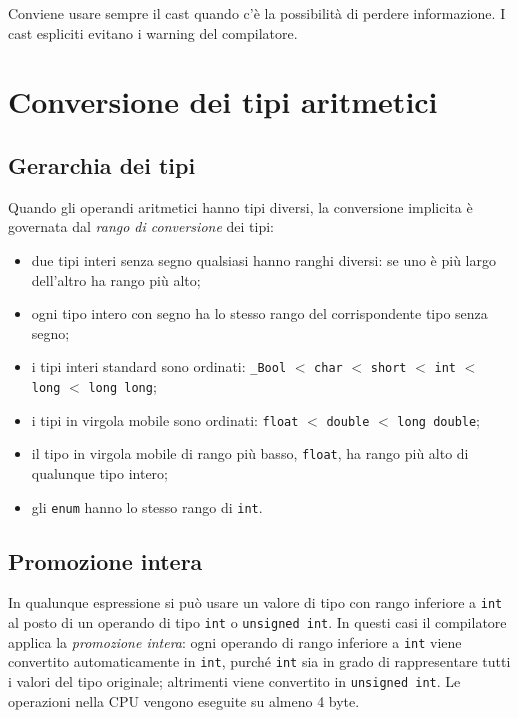 \documentclass[11pt,a4paper]{article}
\begin{document}
\begin{osservazione}
Conviene usare sempre il cast quando c'è la possibilità di perdere informazione. I cast espliciti evitano i warning del compilatore.
\end{osservazione}

\section{Conversione dei tipi aritmetici}

\subsection{Gerarchia dei tipi}

Quando gli operandi aritmetici hanno tipi diversi, la conversione implicita è governata dal \emph{rango di conversione} dei tipi:
\begin{itemize}
    \item due tipi interi senza segno qualsiasi hanno ranghi diversi: se uno è più largo dell'altro ha rango più alto;
    \item ogni tipo intero con segno ha lo stesso rango del corrispondente tipo senza segno;
    \item i tipi interi standard sono ordinati: \lstinline|_Bool| $<$ \lstinline|char| $<$ \lstinline|short| $<$ \lstinline|int| $<$ \lstinline|long| $<$ \lstinline|long long|;
    \item i tipi in virgola mobile sono ordinati: \lstinline|float| $<$ \lstinline|double| $<$ \lstinline|long double|;
    \item il tipo in virgola mobile di rango più basso, \lstinline|float|, ha rango più alto di qualunque tipo intero;
    \item gli \lstinline|enum| hanno lo stesso rango di \lstinline|int|.
\end{itemize}

\subsection{Promozione intera}

In qualunque espressione si può usare un valore di tipo con rango inferiore a \lstinline|int| al posto di un operando di tipo \lstinline|int| o \lstinline|unsigned int|. In questi casi il compilatore applica la \emph{promozione intera}: ogni operando di rango inferiore a \lstinline|int| viene convertito automaticamente in \lstinline|int|, purché \lstinline|int| sia in grado di rappresentare tutti i valori del tipo originale; altrimenti viene convertito in \lstinline|unsigned int|. Le operazioni nella CPU vengono eseguite su almeno 4 byte.
\end{document}
